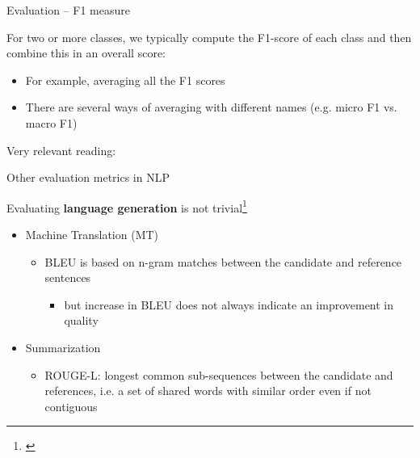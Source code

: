 \documentclass[12pt]{beamer}
\begin{document}
\begin{frame}{Evaluation – F1 measure}
	
For two or more classes, we typically compute the F1-score of each class and then combine this in an overall score:

\begin{itemize}
	\item For example, averaging all the F1 scores
	\item There are several ways of averaging with different names (e.g. micro F1 vs. macro F1)
\end{itemize}

Very relevant reading:

\begin{scriptsize}




\end{scriptsize}
	
\end{frame}


\begin{frame}{Other evaluation metrics in NLP}
	
Evaluating \textbf{language generation} is not trivial\footnote{\begin{scriptsize}\end{scriptsize}}
	
\begin{itemize}
\item Machine Translation (MT)
\begin{itemize}
	\item BLEU is based on n-gram matches between the candidate and reference sentences
	\begin{itemize}
		\item but increase in BLEU does not always indicate an improvement in quality
	\end{itemize}
\end{itemize}
\item Summarization
\begin{itemize}
	\item 	ROUGE-L: longest common sub-sequences between
	the candidate and references, i.e. a set of shared words with similar order even if not contiguous
\end{itemize}
\end{itemize}
	
\vspace{1em }
	
\end{frame}
\end{document}
